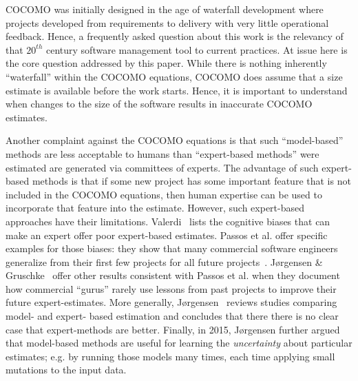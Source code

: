 \documentclass[final,twocolumn]{elsarticle}
\theoremstyle{break}
\begin{document}
COCOMO was initially designed in the age of
waterfall development where projects developed from
requirements to delivery with very little
operational feedback.  Hence, a frequently asked
question about this work is the relevancy of that
$20^{th}$ century software management tool to
current practices.  At issue here is the core
question addressed by this paper.  While there is
nothing inherently ``waterfall'' within the COCOMO
equations, COCOMO does assume that a size estimate
is available before the work starts.  Hence, it is
important to understand when changes to the size of
the software results in inaccurate COCOMO estimates.

Another complaint against the COCOMO equations is
that such ``model-based'' methods are less
acceptable to humans than ``expert-based methods''
were estimated are generated via committees of
experts. The advantage of such expert-based methods
is that if some new project has some important
feature that is not included in the COCOMO
equations, then human expertise can be used to
incorporate that feature into the estimate.
However,
such expert-based approaches have their limitations.
Valerdi~\cite{valerdi11} lists the cognitive biases
that can make an expert offer poor expert-based estimates.
Passos et al. offer specific examples for those
biases: they show that many commercial software
engineers generalize from their first few projects
for all future projects~\cite{passos11}.  J{\o}rgensen
\& Gruschke~\cite{jorgensen09} offer other results
consistent with Passos et al.  when they document
how commercial ``gurus'' rarely use lessons from
past projects to improve their future
expert-estimates.  More generally,
J{\o}rgensen~\cite{Jorgensen2004} reviews studies
comparing model- and expert- based estimation and
concludes that there there is no clear case that
expert-methods are better.  Finally, in 2015,
J{\o}rgensen further argued~\cite{jorg15} that
model-based methods are useful for learning the {\em
  uncertainty} about particular estimates; e.g.  by
running those models many times, each time applying
small mutations to the input data.
\end{document}
